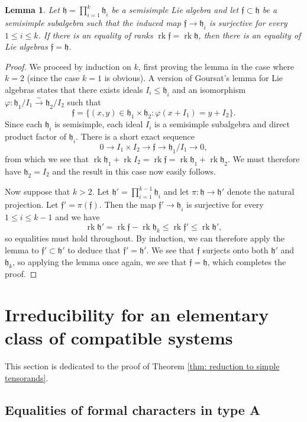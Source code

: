 \documentclass{amsart}
\newtheorem{lemma}[theorem]{Lemma}
\theoremstyle{definition}
\numberwithin{equation}{section} %
\newcommand{\rk}{\operatorname{rk}}
\newcommand{\mf}[1]{\mathfrak{#1}}
\begin{document}
\begin{lemma} \label{lemma: Goursat consequence}
Let $\mf{h} = \prod_{i=1}^k \mf{h}_i$ be a semisimple Lie algebra and let $\mf{f} \subset \mf{h}$ be a semisimple subalgebra such that the induced map $\mf{f} \to \mf{h}_i$ is surjective for every $1 \leq i \leq k$.
If there is an equality of ranks $\rk \mf{f} = \rk \mf{h}$, then there is an equality of Lie algebras $\mf{f} = \mf{h}$.
\end{lemma}
\begin{proof}
We proceed by induction on $k$, first proving the lemma in the case where $k = 2$ (since the case $k=1$ is obvious).
A version of Goursat's lemma for Lie algebras states that there exists ideals $I_i \leq \mf{h}_i$ and an isomorphism $\varphi: \mf{h}_1/I_1 \xrightarrow{\sim} \mf{h}_2/I_2$ such that
\[\mf{f} = \{(x,y) \in \mf{h}_1 \times \mf{h}_2: \varphi(x + I_1) = y + I_2\}.\]
Since each $\mf{h}_i$ is semisimple, each ideal $I_i$ is a semisimple subalgebra and direct product factor of $\mf{h}_i$.
There is a short exact sequence
\[
0 \to I_1 \times I_2 \to \mf{f} \to \mf{h}_1/I_1 \to 0,
\]
from which we see that $ \rk \mf{h}_1 +  \rk I_2 =  \rk \mf{f} = \rk \mf{h}_1 + \rk \mf{h}_2 $.
We must therefore have $\mf{h}_2 = I_2$ and the result in this case now easily follows.

Now suppose that $k>2$.
Let $\mf{h}' = \prod_{i=1}^{k-1} \mf{h}_i$ and let $\pi: \mf{h} \to \mf{h}'$ denote the natural projection.
Let $\mf{f}' = \pi(\mf{f})$.
Then the map $\mf{f}' \to \mf{h}_i$ is surjective for every $1 \leq i \leq k-1$ and we have \[ \rk \mf{h}' = \rk \mf{f} - \rk \mf{h}_k \leq \rk \mf{f'} \leq \rk \mf{h'},\]
so equalities must hold throughout.
By induction, we can therefore apply the lemma to $\mf{f}' \subset \mf{h}'$ to deduce that $\mf{f}' = \mf{h}'$.
We see that $\mf{f}$ surjects onto both $\mf{h}'$ and $\mf{h}_k$, so applying the lemma once again, we see that $\mf{f} = \mf{h}$, which completes the proof.
\end{proof}

\section{Irreducibility for an elementary class of compatible systems} \label{section: simple irreducibility}

This section is dedicated to the proof of Theorem \ref{thm: reduction to simple tensorands}.

\subsection{Equalities of formal characters in type A} \label{subsect: type A formal characters}
\end{document}
